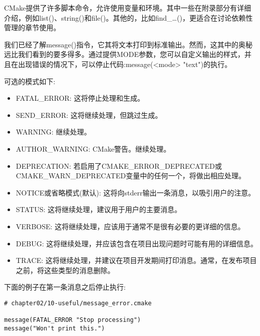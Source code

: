 
CMake提供了许多脚本命令，允许使用变量和环境。其中一些在附录部分有详细介绍，例如list()、string()和file()。其他的，比如find\_…()，更适合在讨论依赖性管理的章节使用。


我们已经了解message()指令，它其将文本打印到标准输出。然而，这其中的奥秘远比我们看到的要多得多。通过提供MODE参数，您可以自定义输出的样式，并且在出现错误的情况下，可以停止代码:message(<mode> "text")的执行。

可选的模式如下:

\begin{itemize}
\item 
FATAL\_ERROR: 这将停止处理和生成。

\item 
SEND\_ERROR: 这将继续处理，但跳过生成。

\item 
WARNING: 继续处理。

\item 
AUTHOR\_WARNING: CMake警告。继续处理。

\item 
DEPRECATION: 若启用了CMAKE\_ERROR\_DEPRECATED或CMAKE\_WARN\_DEPRECATED变量中的任何一个，将做出相应处理。

\item 
NOTICE或省略模式(默认): 这将向stderr输出一条消息，以吸引用户的注意。

\item 
STATUS: 这将继续处理，建议用于用户的主要消息。

\item 
VERBOSE: 这将继续处理，应该用于通常不是很有必要的更详细的信息。

\item 
DEBUG: 这将继续处理，并应该包含在项目出现问题时可能有用的详细信息。

\item 
TRACE: 这将继续处理，并建议在项目开发期间打印消息。通常，在发布项目之前，将这些类型的消息删除。
\end{itemize}

下面的例子在第一条消息之后停止执行:

\begin{lstlisting}[style=styleCMake]
# chapter02/10-useful/message_error.cmake

message(FATAL_ERROR "Stop processing")
message("Won't print this.")
\end{lstlisting}

